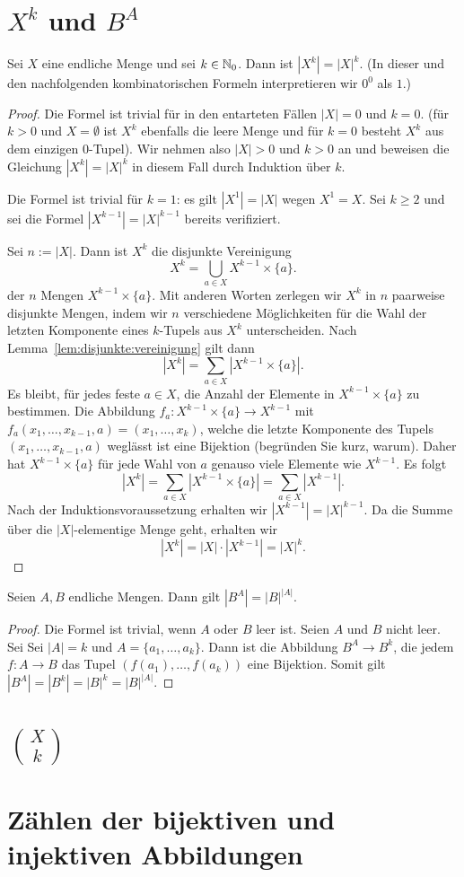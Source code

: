 \section{$X^k$ und $B^A$} 



\begin{thm}
	Sei $X$ eine endliche Menge und sei $k \in \mathbb{N}_0$. Dann ist $|X^k| = |X|^k$. (In dieser und den nachfolgenden kombinatorischen Formeln interpretieren wir $0^0$ als $1$.)
\end{thm} 
\begin{proof} 
	Die Formel ist trivial für in den entarteten Fällen $|X|=0$ und $k=0$.
	(für $k>0$ und $X = \emptyset$ ist $X^k$ ebenfalls die leere Menge und für $k=0$  besteht $X^k$ aus dem einzigen $0$-Tupel).  Wir nehmen also $|X| >0$ und $k>0$ an und beweisen  die Gleichung $|X^k| = |X|^k$  in diesem Fall durch Induktion über $k$. 
	
	Die Formel ist trivial für $k = 1$: es gilt $|X^1| = |X|$ wegen $X^1 = X$. Sei $k \ge 2$ und sei die Formel $|X^{k-1}| = |X|^{k-1}$ bereits verifiziert. 
	
	Sei $n:=|X|$. Dann ist $X^k$ die disjunkte Vereinigung 
	\[
			X^k = \bigcup_{a \in X} X^{k-1} \times \{a\}. 
	\]
	der $n$ Mengen $X^{k-1} \times \{a\}$. Mit anderen Worten zerlegen wir $X^k$ in $n$ paarweise disjunkte Mengen, indem wir $n$ verschiedene Möglichkeiten für die Wahl der letzten Komponente eines $k$-Tupels aus $X^k$ unterscheiden. Nach Lemma~\ref{lem:disjunkte:vereinigung} gilt dann 
	\[
			|X^k| = \sum_{a \in X} |X^{k-1} \times \{a\}|. 
	\]
	Es bleibt, für jedes feste $a \in X$, die Anzahl der Elemente in $X^{k-1} \times \{a\}$ zu bestimmen. Die Abbildung 
	$f_a : X^{k-1} \times \{a\} \to X^{k-1}$ mit $f_a(x_1,\ldots,x_{k-1},a) = (x_1,\ldots,x_k)$, welche die letzte Komponente des Tupels $(x_1,\ldots,x_{k-1},a)$ weglässt ist eine Bijektion (begründen Sie kurz, warum). Daher hat $X^{k-1} \times \{a\}$ für jede Wahl von $a$ genauso viele Elemente wie $X^{k-1}$. Es folgt 
	\[
			|X^k| = \sum_{a \in X} |X^{k-1} \times \{a\}| = \sum_{a \in X} |X^{k-1}|. 
	\]
	Nach der Induktionsvoraussetzung erhalten wir $|X^{k-1}| = |X|^{k-1}$. Da die Summe über die $|X|$-elementige Menge geht, erhalten wir 
	\[
			|X^k| = |X| \cdot |X^{k-1}| = |X|^k. 
	\]
\end{proof} 


\begin{thm}
	Seien $A,B $ endliche Mengen. Dann gilt $|B^A| = |B|^{|A|}$. 
\end{thm}
\begin{proof}
	Die Formel ist trivial, wenn $A$ oder $B$ leer ist. Seien $A$ und $B$ nicht leer. Sei Sei $|A| = k$ und $A = \{a_1,\ldots,a_k\}$. Dann ist die Abbildung $B^A \to B^k$, die jedem $f : A \to B$ das Tupel $(f(a_1),\ldots,f(a_k))$ eine Bijektion. Somit gilt 
	$|B^A | = |B^k| = |B|^k = |B|^{|A|}$.  
\end{proof} 

\section{$\binom{X}{k}$}

\section{Zählen der bijektiven und injektiven Abbildungen} 